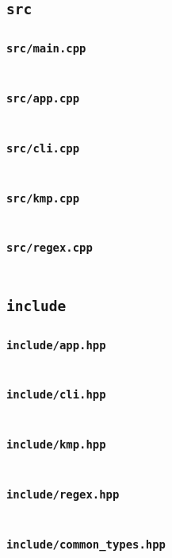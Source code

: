 \documentclass[12pt, a4paper]{ctexart}
\begin{document}
\subsection{\texttt{src}}

\subsubsection{\texttt{src/main.cpp}}
\inputminted{cpp}{../src/main.cpp}

\subsubsection{\texttt{src/app.cpp}}
\inputminted{cpp}{../src/app.cpp}

\subsubsection{\texttt{src/cli.cpp}}
\inputminted{cpp}{../src/cli.cpp}

\subsubsection{\texttt{src/kmp.cpp}}
\inputminted{cpp}{../src/kmp.cpp}

\subsubsection{\texttt{src/regex.cpp}}
\inputminted{cpp}{../src/regex.cpp}

\subsection{\texttt{include}}

\subsubsection{\texttt{include/app.hpp}}
\inputminted{cpp}{../include/app.hpp}

\subsubsection{\texttt{include/cli.hpp}}
\inputminted{cpp}{../include/cli.hpp}

\subsubsection{\texttt{include/kmp.hpp}}
\inputminted{cpp}{../include/kmp.hpp}

\subsubsection{\texttt{include/regex.hpp}}
\inputminted{cpp}{../include/regex.hpp}

\subsubsection{\texttt{include/common_types.hpp}}
\inputminted{cpp}{../include/common_types.hpp}
\end{document}
